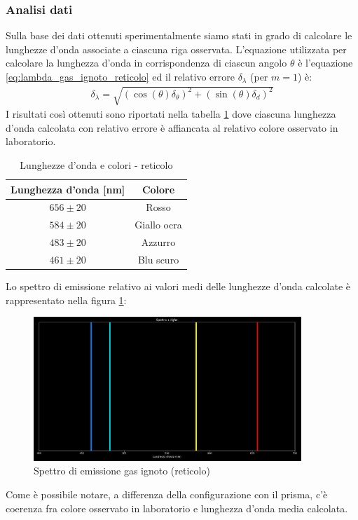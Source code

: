 \documentclass[a4paper]{article}
\begin{document}
\subsubsection{Analisi dati}
Sulla base dei dati ottenuti sperimentalmente siamo stati in grado di calcolare le lunghezze d'onda associate a ciascuna riga osservata. L'equazione utilizzata per calcolare la lunghezza d'onda in corrispondenza di ciascun angolo $\theta$ è l'equazione \ref{eq:lambda_gas_ignoto_reticolo} ed il relativo errore $\delta_\lambda$ (per $m=1$) è:
\begin{align}
\delta_\lambda=\sqrt{(\cos(\theta)\delta_\theta)^2+(\sin(\theta)\delta_d)^2}
\end{align}
I risultati così ottenuti sono riportati nella tabella \ref{tab:tabella_lunghezze_d'onda_reticolo} dove ciascuna lunghezza d'onda calcolata con relativo errore è affiancata al relativo colore osservato in laboratorio.
\begin{table}[htbp]
\centering
\begin{tabular}{|c|c|}
\hline
\textbf{Lunghezza d'onda [nm]} & \textbf{Colore} \\
\hline
$656 \pm 20$ & Rosso  \\
$584 \pm 20$ & Giallo ocra\\
$483 \pm 20$ & Azzurro \\
$461 \pm 20$ & Blu scuro \\
\hline
\end{tabular}
\caption{Lunghezze d'onda e colori - reticolo}
\label{tab:tabella_lunghezze_d'onda_reticolo}
\end{table}
Lo spettro di emissione relativo ai valori medi delle lunghezze d'onda calcolate è rappresentato nella figura \ref{fig:spettro_emissione_gas_ignoto_reticolo}:
\begin{figure}[htbp]
\centering
\includegraphics[width=0.9\textwidth]{grafici/spettro gas ignoto reticolo 300.png}
\caption{Spettro di emissione gas ignoto (reticolo)}
\label{fig:spettro_emissione_gas_ignoto_reticolo}
\end{figure}
Come è possibile notare, a differenza della configurazione con il prisma, c'è coerenza fra colore osservato in laboratorio e lunghezza d'onda media calcolata.
\end{document}
